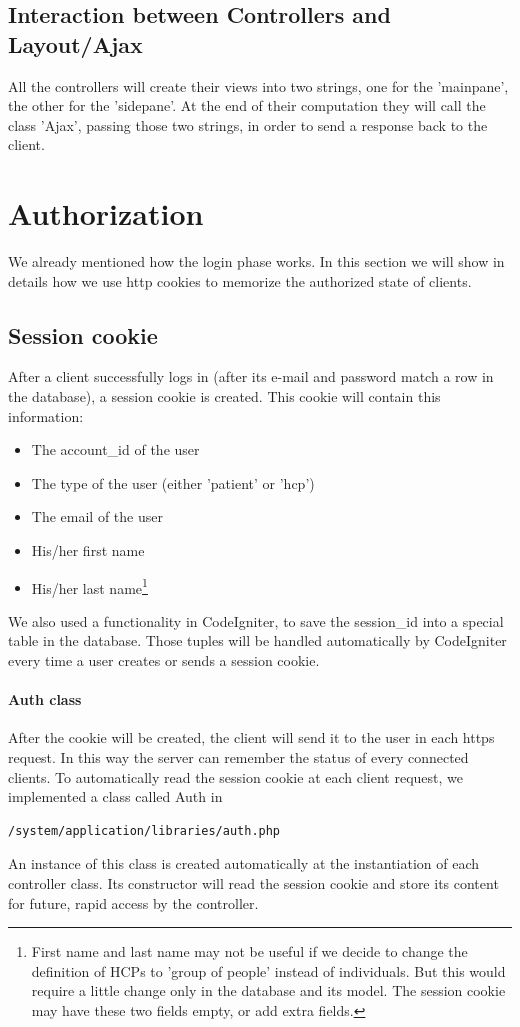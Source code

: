 \documentclass[12pt]{report}
\begin{document}
\subsection{Interaction between Controllers and Layout/Ajax}
All the controllers will create their views into two strings, one for the 'mainpane', the other for the 'sidepane'. At the end of their computation they will call the class 'Ajax', passing those two strings, in order to send a response back to the client.


\section{Authorization}
We already mentioned how the login phase works. In this section we will show in details how we use http cookies to memorize the authorized state of clients.
\subsection{Session cookie}
After a client successfully logs in (after its e-mail and password match a row in the database), a session cookie is created. This cookie will contain this information:
\begin{itemize}
\item The account\_id of the user
\item The type of the user (either 'patient' or 'hcp')
\item The email of the user
\item His/her first name
\item His/her last name\footnote{First name and last name may not be useful if we decide to change the definition of HCPs to 'group of people' instead of individuals. But this would require a little change only in the database and its model. The session cookie may have these two fields empty, or add extra fields.}
\end{itemize}
We also used a functionality in CodeIgniter, to save the session\_id into a special table in the database. Those tuples will be handled automatically by CodeIgniter every time a user creates or sends a session cookie.

\paragraph{Auth class}
After the cookie will be created, the client will send it to the user in each https request. In this way the server can remember the status of every connected clients. To automatically read the session cookie at each client request, we implemented a class called Auth in
\begin{verbatim}
/system/application/libraries/auth.php
\end{verbatim}
An instance of this class is created automatically at the instantiation of each controller class. Its constructor will read the session cookie and store its content for future, rapid access by the controller.
\end{document}
